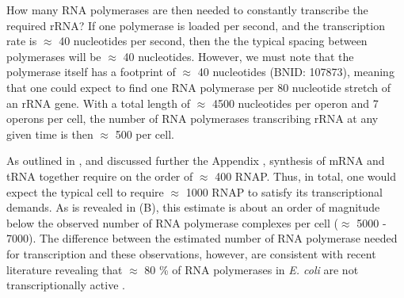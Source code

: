 
How many RNA polymerases are then needed to constantly transcribe the required rRNA?
If one polymerase is loaded per second, and the transcription rate is $\approx$
40 nucleotides per second, then the the typical spacing between polymerases will
be $\approx$ 40 nucleotides. However, we must note that the polymerase itself
has a footprint of $\approx$ 40 nucleotides (BNID: 107873), meaning that one
could expect to find one RNA polymerase per 80 nucleotide stretch of an rRNA
gene.  With a total length of $\approx$ 4500 nucleotides per operon and 7
operons per cell, the number of RNA polymerases transcribing rRNA at any given
time is then $\approx$ 500 per cell.

As outlined in , and discussed further the Appendix
, synthesis of mRNA and tRNA together require on
the order of $\approx$ 400 RNAP. Thus, in total, one would expect the typical
cell to require $\approx$ 1000 RNAP to satisfy its transcriptional demands.
As is revealed in (B), this estimate is about an order of magnitude below the
observed number of RNA polymerase complexes per cell ($\approx$ 5000 - 7000).
The difference between the estimated number of RNA polymerase needed for
transcription and these observations, however, are consistent with recent literature
revealing that $\approx$ 80 \% of RNA polymerases in \textit{E. coli} are not
transcriptionally active \citep{patrick2015}.

